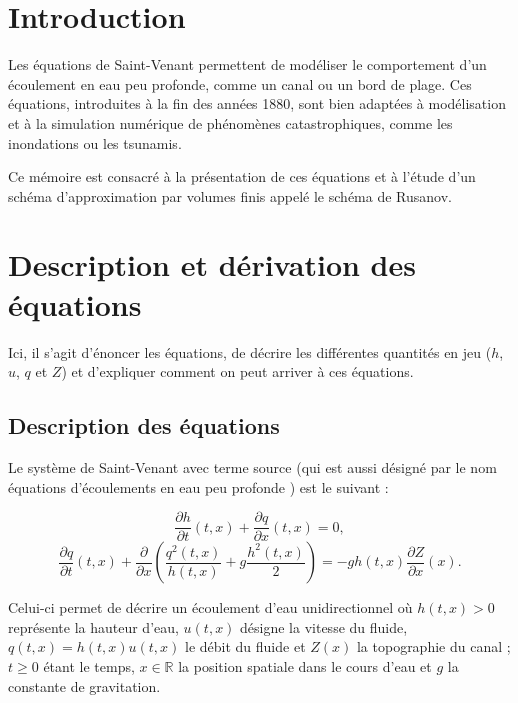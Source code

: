 \documentclass[
11pt, %
francais, %
singlespacing, %
headsepline, %
f%
]{MastersDoctoralThesis} %
\theoremstyle{definition}
\begin{document}
\newpage

\section{Introduction}

Les équations de Saint-Venant permettent de modéliser le comportement d'un écoulement en eau peu profonde, comme un canal ou un bord de plage.
Ces équations, introduites à la fin des années 1880, sont bien adaptées à modélisation et à la simulation numérique de phénomènes 
catastrophiques, comme les inondations ou les tsunamis.

Ce mémoire est consacré à la présentation de ces équations et à l'étude d'un schéma d'approximation par volumes finis appelé le schéma de Rusanov.

\section{Description et dérivation des équations}

Ici, il s'agit  d'énoncer les équations, de décrire les différentes quantités en jeu ($h$, $u$, $q$ et $Z$)
et d'expliquer comment on peut arriver à ces équations.

\subsection{Description des équations}

Le système de Saint-Venant avec terme source (qui est aussi désigné par le nom \og équations d'écoulements en eau peu profonde  \fg{}) est le suivant :

\begin{equation} \frac{\partial h}{\partial t}(t,x)+\frac{\partial q}{\partial x}(t,x)=0, \label{sveq1} \end{equation}
\begin{equation} \frac{\partial q}{\partial t}(t,x)+\frac{\partial}{\partial x}(\frac{q^{2}(t,x)}{h(t,x)}+g\frac{h^{2}(t,x)}{2})=-gh(t,x)\frac{\partial Z}{\partial x}(x). \label{sveq2} \end{equation}

Celui-ci permet de décrire un écoulement d'eau unidirectionnel où $h(t,x)>0$ représente la hauteur d'eau, $u(t,x)$ désigne la vitesse du fluide, $q(t,x)=h(t,x)u(t,x)$ le débit du fluide et $Z(x)$ la topographie du canal ; $t\geq0$ étant le temps, $x\in\mathbb{R}$ la position spatiale dans le cours d'eau et $g$ la constante de gravitation.
\end{document}

